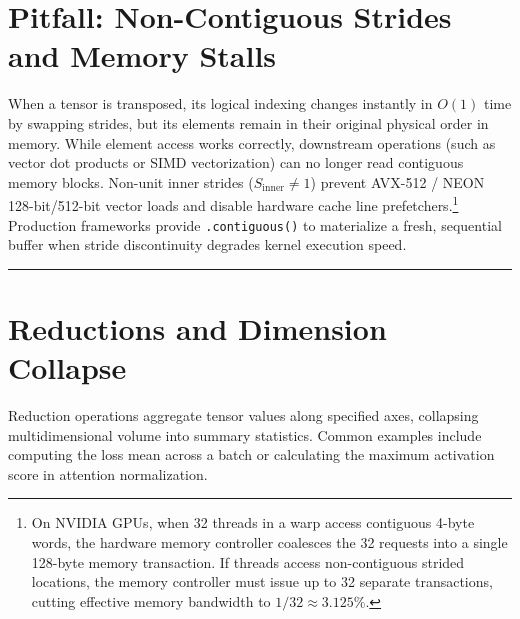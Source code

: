 \documentclass[
  letterpaper,
]{scrbook}
\begin{document}
\section{Pitfall: Non-Contiguous Strides and Memory
Stalls}\label{pitfall-non-contiguous-strides-and-memory-stalls}

When a tensor is transposed, its logical indexing changes instantly in
\(O(1)\) time by swapping strides, but its elements remain in their
original physical order in memory. While element access works correctly,
downstream operations (such as vector dot products or SIMD
vectorization) can no longer read contiguous memory blocks. Non-unit
inner strides (\(S_{\text{inner}} \ne 1\)) prevent AVX-512 / NEON
128-bit/512-bit vector loads and disable hardware cache line
prefetchers.\footnote{On NVIDIA GPUs, when 32 threads in a warp access
  contiguous 4-byte words, the hardware memory controller coalesces the
  32 requests into a single 128-byte memory transaction. If threads
  access non-contiguous strided locations, the memory controller must
  issue up to 32 separate transactions, cutting effective memory
  bandwidth to \(1/32 \approx 3.125\%\).} Production frameworks provide
\texttt{.contiguous()} to materialize a fresh, sequential buffer when
stride discontinuity degrades kernel execution speed.

\begin{center}\rule{0.5\linewidth}{0.5pt}\end{center}

\section{Reductions and Dimension
Collapse}\label{reductions-and-dimension-collapse}

Reduction operations aggregate tensor values along specified axes,
collapsing multidimensional volume into summary statistics. Common
examples include computing the loss mean across a batch or calculating
the maximum activation score in attention normalization.
\end{document}
